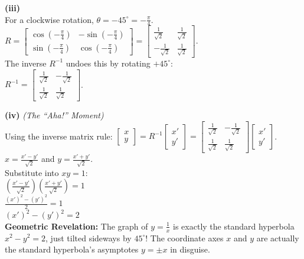 \begin{solution}
\medskip
\textbf{(iii)} \\
For a clockwise rotation, $\theta = -45^\circ = -\frac{\pi}{4}$. \\
$R = \begin{bmatrix} \cos(-\frac{\pi}{4}) & -\sin(-\frac{\pi}{4}) \\ \sin(-\frac{\pi}{4}) & \cos(-\frac{\pi}{4}) \end{bmatrix} = \begin{bmatrix} \frac{1}{\sqrt{2}} & \frac{1}{\sqrt{2}} \\ -\frac{1}{\sqrt{2}} & \frac{1}{\sqrt{2}} \end{bmatrix}$. \\
The inverse $R^{-1}$ undoes this by rotating $+45^\circ$: \\
$R^{-1} = \begin{bmatrix} \frac{1}{\sqrt{2}} & -\frac{1}{\sqrt{2}} \\ \frac{1}{\sqrt{2}} & \frac{1}{\sqrt{2}} \end{bmatrix}$.

\medskip
\textbf{(iv)} \textit{(The ``Aha!'' Moment)} \\
Using the inverse matrix rule: $\begin{bmatrix} x \\ y \end{bmatrix} = R^{-1} \begin{bmatrix} x' \\ y' \end{bmatrix} = \begin{bmatrix} \frac{1}{\sqrt{2}} & -\frac{1}{\sqrt{2}} \\ \frac{1}{\sqrt{2}} & \frac{1}{\sqrt{2}} \end{bmatrix} \begin{bmatrix} x' \\ y' \end{bmatrix}$. \\
$x = \frac{x' - y'}{\sqrt{2}}$ and $y = \frac{x' + y'}{\sqrt{2}}$. \\
Substitute into $xy = 1$: \\
$\left( \frac{x' - y'}{\sqrt{2}} \right) \left( \frac{x' + y'}{\sqrt{2}} \right) = 1$ \\
$\frac{(x')^2 - (y')^2}{2} = 1$ \\
\textbf{$(x')^2 - (y')^2 = 2$} \\
\textbf{Geometric Revelation:} The graph of $y = \frac{1}{x}$ is exactly the standard hyperbola $x^2 - y^2 = 2$, just tilted sideways by $45^\circ$! The coordinate axes $x$ and $y$ are actually the standard hyperbola's asymptotes $y = \pm x$ in disguise.
\end{solution}

